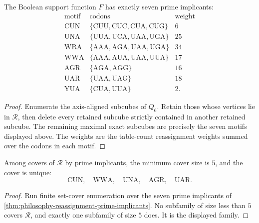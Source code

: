 \begin{theorem}
\label{thm:philosophy-reassignment-prime-implicants}
The Boolean support function $F$ has exactly seven prime implicants:
$$
\begin{array}{c|c|c}
  \text{motif} & \text{codons} & \text{weight}\\
  \hline
  \mathrm{CUN} &
    \{\mathrm{CUU},\mathrm{CUC},\mathrm{CUA},\mathrm{CUG}\} & 6\\
  \mathrm{UNA} &
    \{\mathrm{UUA},\mathrm{UCA},\mathrm{UAA},\mathrm{UGA}\} & 25\\
  \mathrm{WRA} &
    \{\mathrm{AAA},\mathrm{AGA},\mathrm{UAA},\mathrm{UGA}\} & 34\\
  \mathrm{WWA} &
    \{\mathrm{AAA},\mathrm{AUA},\mathrm{UAA},\mathrm{UUA}\} & 17\\
  \mathrm{AGR} &
    \{\mathrm{AGA},\mathrm{AGG}\} & 16\\
  \mathrm{UAR} &
    \{\mathrm{UAA},\mathrm{UAG}\} & 18\\
  \mathrm{YUA} &
    \{\mathrm{CUA},\mathrm{UUA}\} & 2.
\end{array}
$$
\end{theorem}
\begin{proof}
Enumerate the axis-aligned subcubes of $Q_{6}$. Retain those whose
vertices lie in $\mathcal{R}$, then delete every retained subcube
strictly contained in another retained subcube. The remaining maximal
exact subcubes are precisely the seven motifs displayed above. The
weights are the table-count reassignment weights summed over the codons
in each motif.
\end{proof}

\begin{theorem}
\label{thm:philosophy-minimal-prime-implicant-cover}
Among covers of $\mathcal{R}$ by prime implicants, the minimum cover
size is $5$, and the cover is unique:
$$
  \mathrm{CUN},\quad \mathrm{WWA},\quad \mathrm{UNA},
  \quad \mathrm{AGR},\quad \mathrm{UAR}.
$$
\end{theorem}
\begin{proof}
Run finite set-cover enumeration over the seven prime implicants of
\autoref{thm:philosophy-reassignment-prime-implicants}. No subfamily of
size less than $5$ covers $\mathcal{R}$, and exactly one subfamily of
size $5$ does. It is the displayed family.
\end{proof}

